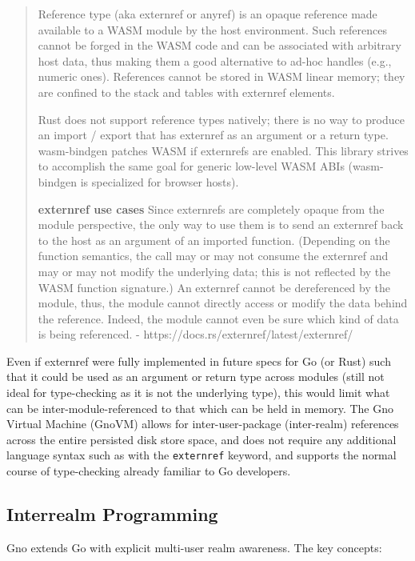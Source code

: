\documentclass[12pt,a4paper]{article}
\newcommand{\passthrough}[1]{#1}
\begin{document}
\begin{quote}
Reference type (aka externref or anyref) is an opaque reference made
available to a WASM module by the host environment. Such references
cannot be forged in the WASM code and can be associated with arbitrary
host data, thus making them a good alternative to ad-hoc handles (e.g.,
numeric ones). References cannot be stored in WASM linear memory; they
are confined to the stack and tables with externref elements.

Rust does not support reference types natively; there is no way to
produce an import / export that has externref as an argument or a return
type. wasm-bindgen patches WASM if externrefs are enabled. This library
strives to accomplish the same goal for generic low-level WASM ABIs
(wasm-bindgen is specialized for browser hosts).

\textbf{externref use cases} Since externrefs are completely opaque from
the module perspective, the only way to use them is to send an externref
back to the host as an argument of an imported function. (Depending on
the function semantics, the call may or may not consume the externref
and may or may not modify the underlying data; this is not reflected by
the WASM function signature.) An externref cannot be dereferenced by the
module, thus, the module cannot directly access or modify the data
behind the reference. Indeed, the module cannot even be sure which kind
of data is being referenced. -
https://docs.rs/externref/latest/externref/
\end{quote}

Even if externref were fully implemented in future specs for Go (or
Rust) such that it could be used as an argument or return type across
modules (still not ideal for type-checking as it is not the underlying
type), this would limit what can be inter-module-referenced to that
which can be held in memory. The Gno Virtual Machine (GnoVM) allows for
inter-user-package (inter-realm) references across the entire persisted
disk store space, and does not require any additional language syntax
such as with the \passthrough{\lstinline!externref!} keyword, and
supports the normal course of type-checking already familiar to Go
developers.

\subsection{Interrealm Programming}\label{interrealm-programming}

Gno extends Go with explicit multi-user realm awareness. The key
concepts:
\end{document}

